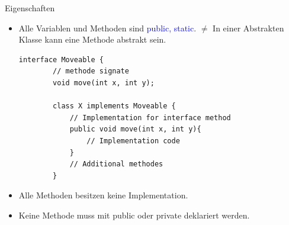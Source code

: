 Eigenschaften
\begin{itemize}
\item Alle Variablen und Methoden sind \textcolor{blue}{public, static}. $\neq$ In einer Abstrakten Klasse kann eine Methode abstrakt sein. 
\begin{lstlisting}[style=C++]
	interface Moveable {
		// methode signate
		void move(int x, int y);
		
		class X implements Moveable {
			// Implementation for interface method
			public void move(int x, int y){
				// Implementation code
			}
			// Additional methodes
		}
	\end{lstlisting}
	\item Alle Methoden besitzen keine Implementation. 
	\item Keine Methode muss mit public oder private deklariert werden. 
\end{itemize}


